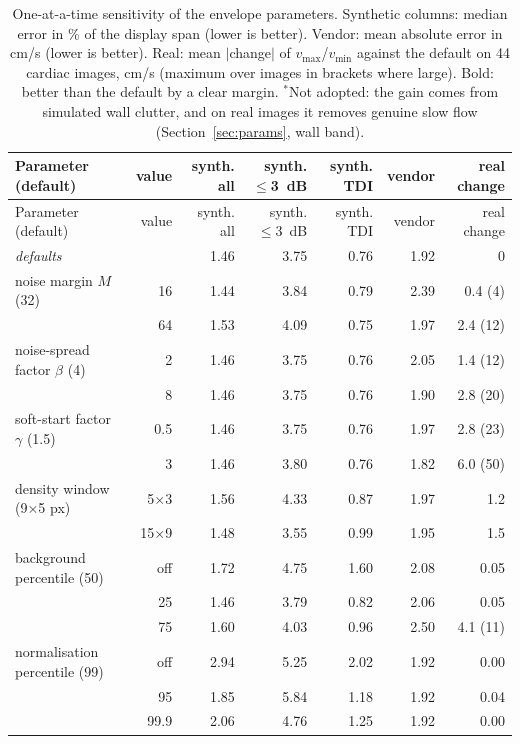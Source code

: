 \documentclass[11pt,a4paper]{article}
\newcommand{\vmax}{v_{\max}}
\newcommand{\vmin}{v_{\min}}
\begin{document}
\begin{small}
\setlength{\tabcolsep}{3.5pt}
\begin{longtable}{@{}>{\raggedright\arraybackslash}p{4.1cm}rrrrrr@{}}
\caption{One-at-a-time sensitivity of the envelope parameters. Synthetic columns: median error in \% of the display
span (lower is better). Vendor: mean absolute error in cm/s (lower is better). Real: mean $|$change$|$ of
$\vmax$/$\vmin$ against the default on 44 cardiac images, cm/s (maximum over images in brackets where large). Bold:
better than the default by a clear margin. $^{*}$Not adopted: the gain comes from simulated wall clutter, and on real
images it removes genuine slow flow (Section~\ref{sec:params}, wall band).}\label{tab:sens}\\
\toprule
Parameter (default) & value & synth. all & synth. $\le$3~dB & synth. TDI & vendor & real change \\ \midrule
\endfirsthead
\toprule
Parameter (default) & value & synth. all & synth. $\le$3~dB & synth. TDI & vendor & real change \\ \midrule
\endhead
\bottomrule
\endfoot
\emph{defaults} & & 1.46 & 3.75 & 0.76 & 1.92 & 0 \\ \midrule
noise margin $M$ (32) & 16 & 1.44 & 3.84 & 0.79 & 2.39 & 0.4 (4) \\
 & 64 & 1.53 & 4.09 & 0.75 & 1.97 & 2.4 (12) \\
noise-spread factor $\beta$ (4) & 2 & 1.46 & 3.75 & 0.76 & 2.05 & 1.4 (12) \\
 & 8 & 1.46 & 3.75 & 0.76 & 1.90 & 2.8 (20) \\
soft-start factor $\gamma$ (1.5) & 0.5 & 1.46 & 3.75 & 0.76 & 1.97 & 2.8 (23) \\
 & 3 & 1.46 & 3.80 & 0.76 & 1.82 & 6.0 (50) \\
density window (9$\times$5 px) & 5$\times$3 & 1.56 & 4.33 & 0.87 & 1.97 & 1.2 \\
 & 15$\times$9 & 1.48 & 3.55 & 0.99 & 1.95 & 1.5 \\
background percentile (50) & off & 1.72 & 4.75 & 1.60 & 2.08 & 0.05 \\
 & 25 & 1.46 & 3.79 & 0.82 & 2.06 & 0.05 \\
 & 75 & 1.60 & 4.03 & 0.96 & 2.50 & 4.1 (11) \\
normalisation percentile (99) & off & 2.94 & 5.25 & 2.02 & 1.92 & 0.00 \\
 & 95 & 1.85 & 5.84 & 1.18 & 1.92 & 0.04 \\
 & 99.9 & 2.06 & 4.76 & 1.25 & 1.92 & 0.00 \\

\end{longtable}
\end{small}
\end{document}
